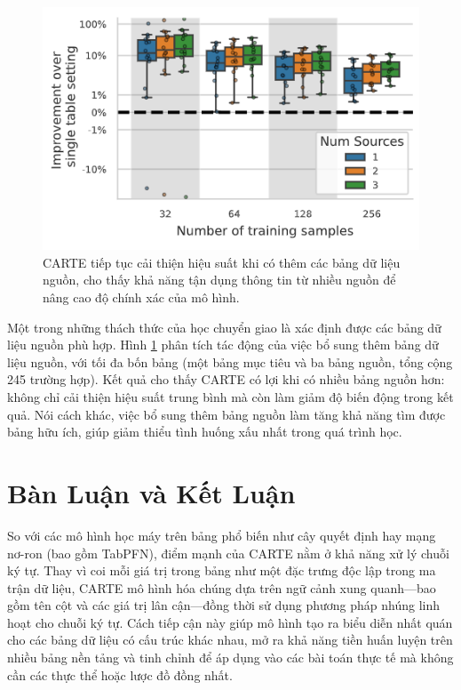\documentclass{article}
\begin{document}
\begin{figure} 
    \centering
    \includegraphics[scale = 0.8]{carte_benefits_from_additional_source_tables.png}
    \caption{CARTE tiếp tục cải thiện hiệu suất khi có thêm các bảng dữ liệu nguồn, cho thấy khả năng tận dụng thông tin từ nhiều nguồn để nâng cao độ chính xác của mô hình.}
    \label{fig:carte_benefits_from_additional_source_tables}
\end{figure}

Một trong những thách thức của học chuyển giao là xác định được các bảng dữ liệu nguồn phù hợp. Hình \ref{fig:carte_benefits_from_additional_source_tables} phân tích tác động của việc bổ sung thêm bảng dữ liệu nguồn, với tối đa bốn bảng (một bảng mục tiêu và ba bảng nguồn, tổng cộng 245 trường hợp). Kết quả cho thấy CARTE có lợi khi có nhiều bảng nguồn hơn: không chỉ cải thiện hiệu suất trung bình mà còn làm giảm độ biến động trong kết quả. Nói cách khác, việc bổ sung thêm bảng nguồn làm tăng khả năng tìm được bảng hữu ích, giúp giảm thiểu tình huống xấu nhất trong quá trình học.

\section{Bàn Luận và Kết Luận}
So với các mô hình học máy trên bảng phổ biến như cây quyết định hay mạng nơ-ron (bao gồm TabPFN), điểm mạnh của CARTE nằm ở khả năng xử lý chuỗi ký tự. Thay vì coi mỗi giá trị trong bảng như một đặc trưng độc lập trong ma trận dữ liệu, CARTE mô hình hóa chúng dựa trên ngữ cảnh xung quanh—bao gồm tên cột và các giá trị lân cận—đồng thời sử dụng phương pháp nhúng linh hoạt cho chuỗi ký tự. Cách tiếp cận này giúp mô hình tạo ra biểu diễn nhất quán cho các bảng dữ liệu có cấu trúc khác nhau, mở ra khả năng tiền huấn luyện trên nhiều bảng nền tảng và tinh chỉnh để áp dụng vào các bài toán thực tế mà không cần các thực thể hoặc lược đồ đồng nhất.
\end{document}
